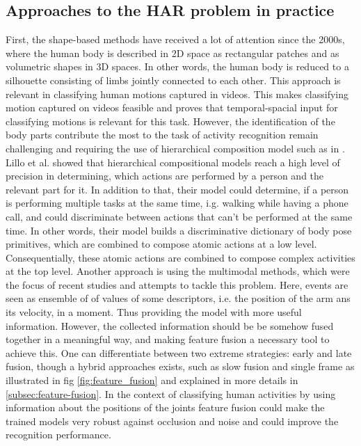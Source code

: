 \subsection{Approaches to the HAR problem in practice}\label{subsec:approachesHAR}
First, the shape-based methods have received a lot of attention since the 2000s, where the human body is described in 2D space as rectangular patches and as volumetric shapes in 3D spaces. In other words, the human body is reduced to a silhouette consisting of limbs jointly connected to each other. This approach is relevant in classifying human motions captured in videos\cite{vrigkas2015review}. This makes classifying motion captured on videos feasible and proves that temporal-spacial input for classifying motions is relevant for this task. However, the identification of the body parts contribute the most to the task of activity recognition remain challenging and requiring the use of hierarchical composition model such as in \cite{lillo2014discriminative}. Lillo et al. showed that hierarchical compositional models reach a high level of precision in determining, which actions are performed by a person and the relevant part for it. In addition to that, their model could determine, if a person is performing multiple tasks at the same time, i.g. walking while having a phone call, and could discriminate between actions that can't be performed at the same time. In other words, their model builds a discriminative dictionary of body pose primitives, which are combined to compose atomic actions at a low level. Consequentially, these atomic actions are combined to compose complex activities at the top level\cite{lillo2014discriminative}.\newline
Another approach is using the multimodal methods, which were the focus of recent studies and attempts to tackle this problem. Here, events are seen as ensemble of of values of some descriptors, i.e. the position of the arm ans its velocity, in a moment. Thus providing the model with more useful information. However, the collected information should be be somehow fused together in a meaningful way, and making feature fusion a necessary tool to achieve this. One can differentiate between two extreme strategies: early and late fusion, though a hybrid approaches exists, such as slow fusion and single frame as illustrated in fig \ref{fig:feature_fusion} and explained in more details in \ref{subsec:feature-fusion}. In the context of classifying human activities by using information about the positions of the joints feature fusion could make the trained models very robust against occlusion and noise and could improve the recognition performance\cite{vrigkas2015review}.
